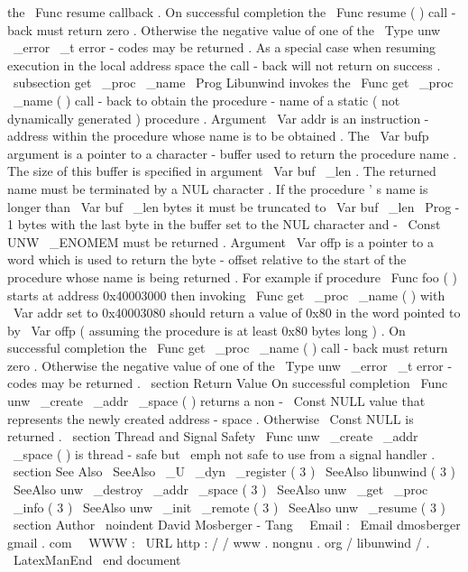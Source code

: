 the
\
Func
{
resume
}
callback
.
On
successful
completion
the
\
Func
{
resume
}
(
)
call
-
back
must
return
zero
.
Otherwise
the
negative
value
of
one
of
the
\
Type
{
unw
\
_error
\
_t
}
error
-
codes
may
be
returned
.
As
a
special
case
when
resuming
execution
in
the
local
address
space
the
call
-
back
will
not
return
on
success
.
\
subsection
{
get
\
_proc
\
_name
}
\
Prog
{
Libunwind
}
invokes
the
\
Func
{
get
\
_proc
\
_name
}
(
)
call
-
back
to
obtain
the
procedure
-
name
of
a
static
(
not
dynamically
generated
)
procedure
.
Argument
\
Var
{
addr
}
is
an
instruction
-
address
within
the
procedure
whose
name
is
to
be
obtained
.
The
\
Var
{
bufp
}
argument
is
a
pointer
to
a
character
-
buffer
used
to
return
the
procedure
name
.
The
size
of
this
buffer
is
specified
in
argument
\
Var
{
buf
\
_len
}
.
The
returned
name
must
be
terminated
by
a
NUL
character
.
If
the
procedure
'
s
name
is
longer
than
\
Var
{
buf
\
_len
}
bytes
it
must
be
truncated
to
\
Var
{
buf
\
_len
}
\
Prog
{
-
1
}
bytes
with
the
last
byte
in
the
buffer
set
to
the
NUL
character
and
-
\
Const
{
UNW
\
_ENOMEM
}
must
be
returned
.
Argument
\
Var
{
offp
}
is
a
pointer
to
a
word
which
is
used
to
return
the
byte
-
offset
relative
to
the
start
of
the
procedure
whose
name
is
being
returned
.
For
example
if
procedure
\
Func
{
foo
}
(
)
starts
at
address
0x40003000
then
invoking
\
Func
{
get
\
_proc
\
_name
}
(
)
with
\
Var
{
addr
}
set
to
0x40003080
should
return
a
value
of
0x80
in
the
word
pointed
to
by
\
Var
{
offp
}
(
assuming
the
procedure
is
at
least
0x80
bytes
long
)
.
On
successful
completion
the
\
Func
{
get
\
_proc
\
_name
}
(
)
call
-
back
must
return
zero
.
Otherwise
the
negative
value
of
one
of
the
\
Type
{
unw
\
_error
\
_t
}
error
-
codes
may
be
returned
.
\
section
{
Return
Value
}
On
successful
completion
\
Func
{
unw
\
_create
\
_addr
\
_space
}
(
)
returns
a
non
-
\
Const
{
NULL
}
value
that
represents
the
newly
created
address
-
space
.
Otherwise
\
Const
{
NULL
}
is
returned
.
\
section
{
Thread
and
Signal
Safety
}
\
Func
{
unw
\
_create
\
_addr
\
_space
}
(
)
is
thread
-
safe
but
\
emph
{
not
}
safe
to
use
from
a
signal
handler
.
\
section
{
See
Also
}
\
SeeAlso
{
\
_U
\
_dyn
\
_register
(
3
)
}
\
SeeAlso
{
libunwind
(
3
)
}
\
SeeAlso
{
unw
\
_destroy
\
_addr
\
_space
(
3
)
}
\
SeeAlso
{
unw
\
_get
\
_proc
\
_info
(
3
)
}
\
SeeAlso
{
unw
\
_init
\
_remote
(
3
)
}
\
SeeAlso
{
unw
\
_resume
(
3
)
}
\
section
{
Author
}
\
noindent
David
Mosberger
-
Tang
\
\
Email
:
\
Email
{
dmosberger
gmail
.
com
}
\
\
WWW
:
\
URL
{
http
:
/
/
www
.
nongnu
.
org
/
libunwind
/
}
.
\
LatexManEnd
\
end
{
document
}
